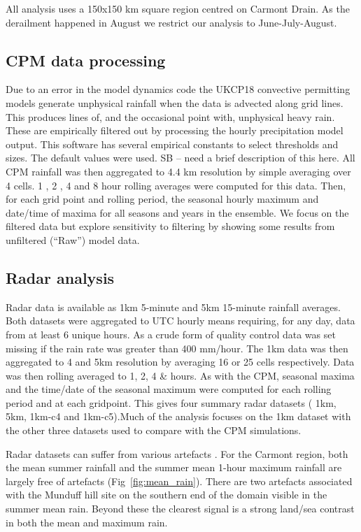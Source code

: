 \documentclass[11pt,a4paper]{article}
\begin{document}
All analysis uses a 150x150 km square region centred on  Carmont Drain. As the derailment happened in August we restrict our analysis to June-July-August. 

\subsection{CPM data processing}

Due to an error in the model dynamics code the UKCP18 convective permitting models generate unphysical rainfall when the data is advected along grid lines. This produces lines of, and the occasional point with, unphysical heavy rain. These are empirically filtered out  by processing the hourly precipitation model output. This software has several empirical constants to select thresholds and sizes. The default values were used.  SB -- need a brief description of this here. 
 All CPM rainfall was then aggregated to 4.4 km resolution by simple averaging over 4 cells. 1 , 2 , 4  and 8 hour rolling averages were computed for this data. Then, for each grid point and rolling period,  the seasonal hourly maximum and date/time of maxima for all seasons and years in the ensemble. We focus on the filtered data but  explore sensitivity to filtering by showing some results from unfiltered (``Raw'') model data. 

\subsection{Radar analysis}
Radar data is available  as  1km 5-minute and 5km 15-minute rainfall averages.  Both datasets  were aggregated to UTC hourly means requiring, for any day, data from at least 6  unique hours. As a crude form of quality control data was set missing if the rain rate was greater than 400 mm/hour.  The 1km data was then aggregated to 4 and 5km resolution by averaging 16 or 25 cells respectively. Data was then rolling averaged to 1, 2, 4 \& hours. As with the CPM,  seasonal maxima and the time/date of the seasonal maximum were computed for each rolling period and at each gridpoint. This gives four summary radar datasets ( 1km, 5km,  1km-c4 and  1km-c5).Much of the analysis focuses on the 1km dataset with the  other three datasets used to compare with the CPM simulations. 

Radar datasets can suffer from various artefacts \parencite{artefacts}.
For the Carmont region, both the mean summer rainfall and the summer mean 1-hour maximum rainfall are largely free of artefacts (Fig~\ref{fig:mean_rain}). There are two artefacts associated with the Munduff hill site on the southern end of the domain visible in the summer mean rain. Beyond these the clearest signal is a strong land/sea contrast in both the mean and maximum rain. 
\end{document}

